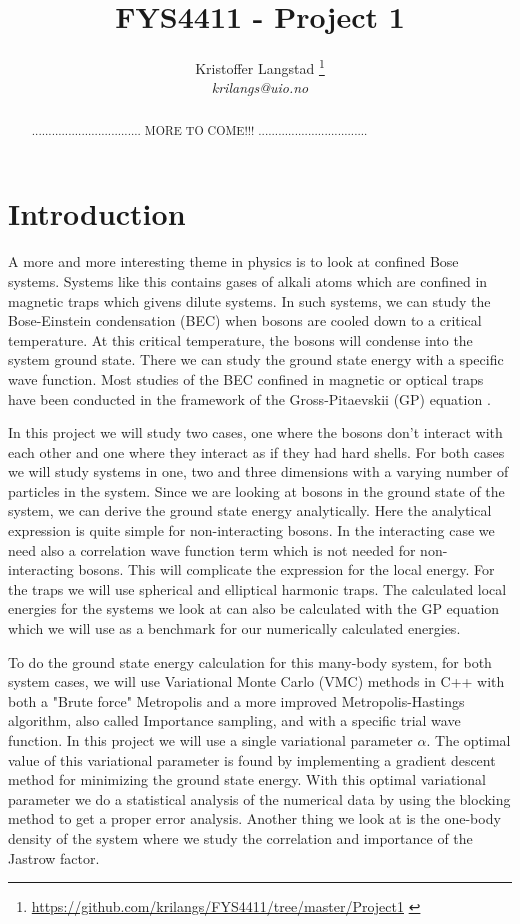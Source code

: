 \documentclass[12pt,a4paper,english]{article}
\title{FYS4411 - Project 1}
\date{}
\author{ Kristoffer Langstad \footnote{\url{https://github.com/krilangs/FYS4411/tree/master/Project1} \cite{GitHub}}\\ \textit{krilangs@uio.no}}
\begin{document}
\maketitle
\begin{abstract}
	.................................
	MORE TO COME!!!
	.................................
\end{abstract}

\section{Introduction}
\label{sect:Introduction}
A more and more interesting theme in physics is to look at confined Bose systems. Systems like this contains gases of alkali atoms which are confined in magnetic traps which givens dilute systems. In such systems, we can study the Bose-Einstein condensation (BEC) when bosons are cooled down to a critical temperature. At this critical temperature, the bosons will condense into the system ground state. There we can study the ground state energy with a specific wave function. Most studies of the BEC confined in magnetic or optical traps have been conducted in the framework of the Gross-Pitaevskii (GP) equation \cite{nilsen2005vortices}.

In this project we will study two cases, one where the bosons don't interact with each other and one where they interact as if they had hard shells. For both cases we will study systems in one, two and three dimensions with a varying number of particles in the system. Since we are looking at bosons in the ground state of the system, we can derive the ground state energy analytically. Here the analytical expression is quite simple for non-interacting bosons. In the interacting case we need also a correlation wave function term which is not needed for non-interacting bosons. This will complicate the expression for the local energy. For the traps we will use spherical and elliptical harmonic traps. The calculated local energies for the systems we look at can also be calculated with the GP equation which we will use as a benchmark for our numerically calculated energies.

To do the ground state energy calculation for this many-body system, for both system cases, we will use Variational Monte Carlo (VMC) methods in C++ with both a "Brute force" Metropolis and a more improved Metropolis-Hastings algorithm, also called Importance sampling, and with a specific trial wave function. In this project we will use a single variational parameter $\alpha$. The optimal value of this variational parameter is found by implementing a gradient descent method for minimizing the ground state energy. With this optimal variational parameter we do a statistical analysis of the numerical data by using the blocking method to get a proper error analysis. Another thing we look at is the one-body density of the system where we study the correlation and importance of the Jastrow factor.
\end{document}
